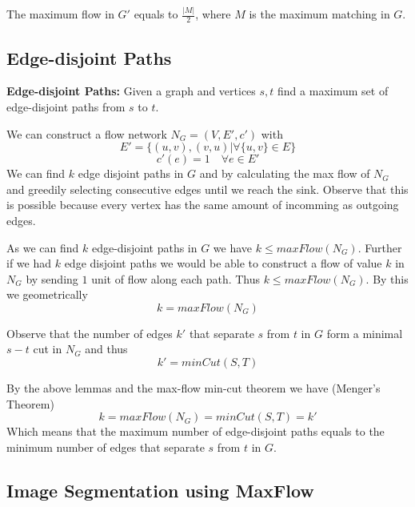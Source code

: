 \begin{lemma}
	The maximum flow in $G'$ equals to $\frac{|M|}{2}$, where $M$ is the maximum matching in $G$.
\end{lemma}

\subsection{Edge-disjoint Paths}

\begin{definition}
	\textbf{Edge-disjoint Paths: } Given a graph and vertices $s, t$ find a maximum set of edge-disjoint paths from $s$ to $t$.
\end{definition}

\begin{remark}
	We can construct a flow network $N_G = (V, E', c')$ with
	$$E' = \{(u,v), (v,u) | \forall \{u,v\} \in E \}$$
	$$c'(e) = 1 \quad \forall e \in E'$$
	We can find $k$ edge disjoint paths in $G$ and by calculating the max flow of $N_G$ and greedily selecting consecutive edges until we reach the sink. Observe that this is possible because every vertex has the same amount of incomming as outgoing edges.
\end{remark}

\begin{lemma}
	As we can find $k$ edge-disjoint paths in $G$ we have $k \leq maxFlow(N_G)$. Further if we had $k$ edge disjoint paths we would be able to construct a flow of value $k$ in $N_G$ by sending $1$ unit of flow along each path. Thus $k \leq maxFlow(N_G)$. By this we geometrically
	$$k = maxFlow(N_G)$$
\end{lemma}

\begin{lemma}
	Observe that the number of edges $k'$ that separate $s$ from $t$ in $G$ form a minimal $s-t$ cut in $N_G$ and thus
	$$k' = minCut(S,T)$$
\end{lemma}

\begin{theorem}
	By the above lemmas and the max-flow min-cut theorem we have (Menger's Theorem)
	$$k = maxFlow(N_G) = minCut(S,T) = k'$$
	Which means that the maximum number of edge-disjoint paths equals to the minimum number of edges that separate $s$ from $t$ in $G$.
\end{theorem}

\subsection{Image Segmentation using MaxFlow}

